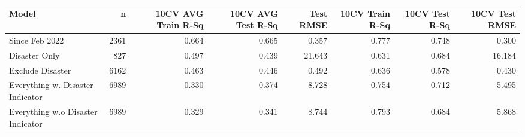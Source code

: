 
\begin{tabular}{l|r|r|r|r|r|r|r}
\hline
Model & n & 10CV AVG Train R-Sq & 10CV AVG Test R-Sq & Test RMSE & 10CV Train R-Sq & 10CV Test R-Sq & 10CV Test RMSE\\
\hline
Since Feb 2022 & 2361 & 0.664 & 0.665 & 0.357 & 0.777 & 0.748 & 0.300\\
\hline
Disaster Only & 827 & 0.497 & 0.439 & 21.643 & 0.631 & 0.684 & 16.184\\
\hline
Exclude Disaster & 6162 & 0.463 & 0.446 & 0.492 & 0.636 & 0.578 & 0.430\\
\hline
Everything w. Disaster Indicator & 6989 & 0.330 & 0.374 & 8.728 & 0.754 & 0.712 & 5.495\\
\hline
Everything w.o Disaster Indicator & 6989 & 0.329 & 0.341 & 8.744 & 0.793 & 0.684 & 5.868\\
\hline
\end{tabular}
